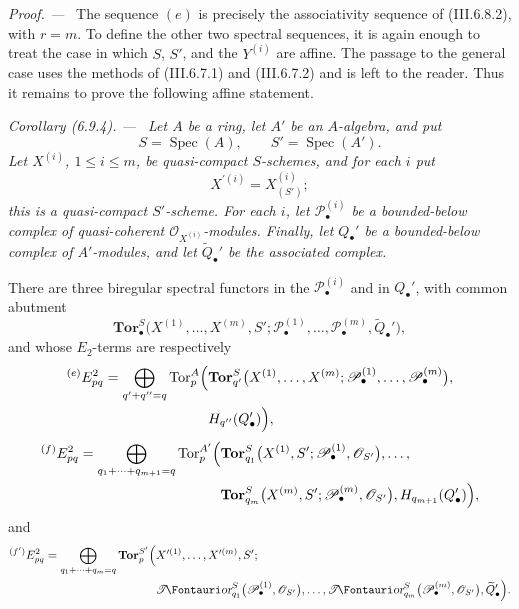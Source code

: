 \documentclass[10pt,oneside]{book}
\newcommand{\sh}[1]{\mathscr{#1}}
\newcommand{\shTor}{\sh{T}\textup{\kern-2.2pt{\Fontauri\slshape or}}}
\newcommand{\Spec}{\operatorname{Spec}}
\newcommand{\Tor}{\operatorname{Tor}}
\newcommand{\sref}[2][]{(#2)}
\newenvironment{corollary}[1][]{\par\medskip\noindent\itshape Corollary (#1). ---\ }{\par}
\newenvironment{proof}{\par\medskip\noindent\textit{Proof. ---\ }}{\par}
\begin{document}
\begin{proof}
The sequence $(e)$ is precisely the associativity sequence of
\sref{III.6.8.2}, with $r=m$.  To define the other two spectral
sequences, it is again enough to treat the case in which $S$, $S'$,
and the $Y^{(i)}$ are affine.  The passage to the general case uses
the methods of \sref{III.6.7.1} and \sref{III.6.7.2} and is left to
the reader.  Thus it remains to prove the following affine
statement.
\end{proof}

\begin{corollary}[6.9.4]
\label{III.6.9.4}
Let $A$ be a ring, let $A'$ be an $A$-algebra, and put
\[
  S=\Spec(A),
  \qquad
  S'=\Spec(A').
\]
Let $X^{(i)}$, $1\leq i\leq m$, be quasi-compact $S$-schemes, and
for each $i$ put
\[
  X^{\prime(i)}=X_{(S')}^{(i)};
\]
this is a quasi-compact $S'$-scheme.  For each $i$, let
$\sh P_\bullet^{(i)}$ be a bounded-below complex of quasi-coherent
$\sh O_{X^{(i)}}$-modules.  Finally, let $Q_\bullet'$ be a
bounded-below complex of $A'$-modules, and let
$\widetilde Q_\bullet'$ be the associated complex.

There are three biregular spectral functors in the
$\sh P_\bullet^{(i)}$ and in $Q_\bullet'$, with common abutment
\[
  \mathbf{Tor}_\bullet^S
  \bigl(
    X^{(1)},\ldots,X^{(m)},S';
    \sh P_\bullet^{(1)},\ldots,\sh P_\bullet^{(m)},
    \widetilde Q_\bullet'
  \bigr),
\]
and whose $E_2$-terms are respectively
\[
\begin{split}
  {}^{(e)}E_{pq}^2
  =
  \bigoplus_{q'+q''=q}
  \Tor_p^A
  \Bigl(
    &
    \mathbf{Tor}_{q'}^S
    \bigl(
      X^{(1)},\ldots,X^{(m)};
      \sh P_\bullet^{(1)},\ldots,\sh P_\bullet^{(m)}
    \bigr),
    \\
    &
    H_{q''}(Q_\bullet')
  \Bigr),
\end{split}
\]
\[
\begin{split}
  {}^{(f)}E_{pq}^2
  =
  \bigoplus_{q_1+\cdots+q_{m+1}=q}
  \Tor_p^{A'}
  \Bigl(
    &
    \mathbf{Tor}_{q_1}^S
    \bigl(
      X^{(1)},S';
      \sh P_\bullet^{(1)},\sh O_{S'}
    \bigr),
    \ldots,
    \\
    &
    \mathbf{Tor}_{q_m}^S
    \bigl(
      X^{(m)},S';
      \sh P_\bullet^{(m)},\sh O_{S'}
    \bigr),
    H_{q_{m+1}}(Q_\bullet')
  \Bigr),
\end{split}
\]
and
\[
\begin{split}
  {}^{(f')}E_{pq}^2
  =
  \bigoplus_{q_1+\cdots+q_m=q}
  \mathbf{Tor}_p^{S'}
  \Bigl(
    &
    X^{\prime(1)},\ldots,X^{\prime(m)},S';
    \\
    &
    \shTor_{q_1}^S
    \bigl(
      \sh P_\bullet^{(1)},\sh O_{S'}
    \bigr),
    \ldots,
    \shTor_{q_m}^S
    \bigl(
      \sh P_\bullet^{(m)},\sh O_{S'}
    \bigr),
    \widetilde Q_\bullet'
  \Bigr).
\end{split}
\]
\end{corollary}
\end{document}
